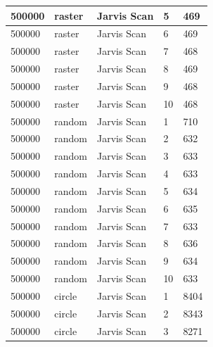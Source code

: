 \documentclass[12pt]{article}
\begin{document}
\begin{longtable}{|l|l|l|l|l|}
500000       & raster            & Jarvis Scan & 5          & 469                           \\ \hline
500000       & raster            & Jarvis Scan & 6          & 469                           \\ \hline
500000       & raster            & Jarvis Scan & 7          & 468                           \\ \hline
500000       & raster            & Jarvis Scan & 8          & 469                           \\ \hline
500000       & raster            & Jarvis Scan & 9          & 468                           \\ \hline
500000       & raster            & Jarvis Scan & 10         & 468                           \\ \hline
500000       & random            & Jarvis Scan & 1          & 710                           \\ \hline
500000       & random            & Jarvis Scan & 2          & 632                           \\ \hline
500000       & random            & Jarvis Scan & 3          & 633                           \\ \hline
500000       & random            & Jarvis Scan & 4          & 633                           \\ \hline
500000       & random            & Jarvis Scan & 5          & 634                           \\ \hline
500000       & random            & Jarvis Scan & 6          & 635                           \\ \hline
500000       & random            & Jarvis Scan & 7          & 633                           \\ \hline
500000       & random            & Jarvis Scan & 8          & 636                           \\ \hline
500000       & random            & Jarvis Scan & 9          & 634                           \\ \hline
500000       & random            & Jarvis Scan & 10         & 633                           \\ \hline
500000       & circle            & Jarvis Scan & 1          & 8404                          \\ \hline
500000       & circle            & Jarvis Scan & 2          & 8343                          \\ \hline
500000       & circle            & Jarvis Scan & 3          & 8271                          \\ \hline

\end{longtable}
\end{document}
